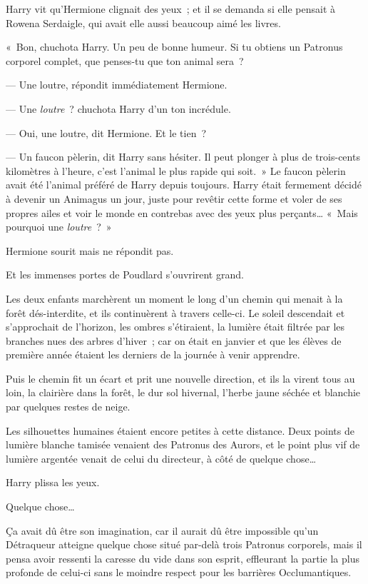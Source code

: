 Harry vit qu'Hermione clignait des yeux~; et il se demanda si elle pensait à Rowena Serdaigle, qui avait elle aussi beaucoup aimé les livres.

«~Bon, chuchota Harry.
Un peu de bonne humeur.
Si tu obtiens un Patronus corporel complet, que penses-tu que ton animal sera~?

--- Une loutre, répondit immédiatement Hermione.

--- Une \emph{loutre}~? chuchota Harry d'un ton incrédule.

--- Oui, une loutre, dit Hermione.
Et le tien~?

--- Un faucon pèlerin, dit Harry sans hésiter.
Il peut plonger à plus de trois-cents kilomètres à l'heure, c'est l'animal le plus rapide qui soit.~»
Le faucon pèlerin avait été l'animal préféré de Harry depuis toujours.
Harry était fermement décidé à devenir un Animagus un jour, juste pour revêtir cette forme et voler de ses propres ailes et voir le monde en contrebas avec des yeux plus perçants…
«~Mais pourquoi une \emph{loutre}~?~»

Hermione sourit mais ne répondit pas.

Et les immenses portes de Poudlard s'ouvrirent grand.

Les deux enfants marchèrent un moment le long d'un chemin qui menait à la forêt dés-interdite, et ils continuèrent à travers celle-ci.
Le soleil descendait et s'approchait de l'horizon, les ombres s'étiraient, la lumière était filtrée par les branches nues des arbres d'hiver~; car on était en janvier et que les élèves de première année étaient les derniers de la journée à venir apprendre.

Puis le chemin fit un écart et prit une nouvelle direction, et ils la virent tous au loin, la clairière dans la forêt, le dur sol hivernal, l'herbe jaune séchée et blanchie par quelques restes de neige.

Les silhouettes humaines étaient encore petites à cette distance.
Deux points de lumière blanche tamisée venaient des Patronus des Aurors, et le point plus vif de lumière argentée venait de celui du directeur, à côté de quelque chose…

Harry plissa les yeux.

Quelque chose…

Ça avait dû être son imagination, car il aurait dû être impossible qu'un Détraqueur atteigne quelque chose situé par-delà trois Patronus corporels, mais il pensa avoir ressenti la caresse du vide dans son esprit, effleurant la partie la plus profonde de celui-ci sans le moindre respect pour les barrières Occlumantiques.

